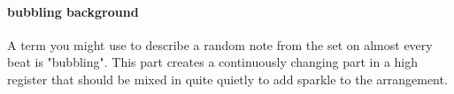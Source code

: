 \paragraph{bubbling background}
A term you might use to describe a random note from the set on almost every beat
is "bubbling". This part creates a continuously changing part in
a high register that should be mixed in quite quietly to add sparkle
to the arrangement.